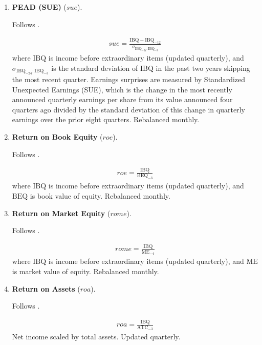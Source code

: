\begin{enumerate}
	
	
	\item \textbf{PEAD (SUE)} ($sue$). 
	
	Follows . 
	
	\begin{align*}
		sue = \frac{ \mathrm{IBQ} - \mathrm{IBQ}_{-12} }{ \sigma_{\mathrm{IBQ}_{-24}:\mathrm{IBQ}_{-3} } }
	\end{align*}
	where $\mathrm{IBQ}$ is income before extraordinary items (updated quarterly), and $\sigma_{\mathrm{IBQ}_{-24}:\mathrm{IBQ}_{-3}}$ is the standard deviation of $\mathrm{IBQ}$ in the past two years skipping the most recent quarter. Earnings surprises are measured by Standardized Unexpected Earnings (SUE), which is the change in the most recently announced quarterly earnings per share from its value announced four quarters ago divided by the standard deviation of this change in quarterly earnings over the prior eight quarters. Rebalanced monthly.
	
	
	
	\item \textbf{Return on Book Equity} ($roe$). 
	
	Follows . 
	
	\begin{align*}
		roe = \frac{ \mathrm{IBQ} }{ \mathrm{BEQ}_{-3} }
	\end{align*}
	where $\mathrm{IBQ}$ is income before extraordinary items (updated quarterly), and $\mathrm{BEQ}$ is book value of equity. Rebalanced monthly.
	
	
	
	\item \textbf{Return on Market Equity} ($rome$). 
	
	Follows . 
	
	\begin{align*}
		rome = \frac{ \mathrm{IBQ} }{ \mathrm{ME}_{-4} }
	\end{align*}
	where $\mathrm{IBQ}$ is income before extraordinary items (updated quarterly), and $\mathrm{ME}$ is market value of equity. Rebalanced monthly.
	
	
	
	\item \textbf{Return on Assets} ($roa$). 
	
	Follows . 
	
	\begin{align*}
		roa = \frac{ \mathrm{IBQ} }{ \mathrm{ATC}_{-3} }
	\end{align*}
	Net income scaled by total assets. Updated quarterly.
	

\end{enumerate}
